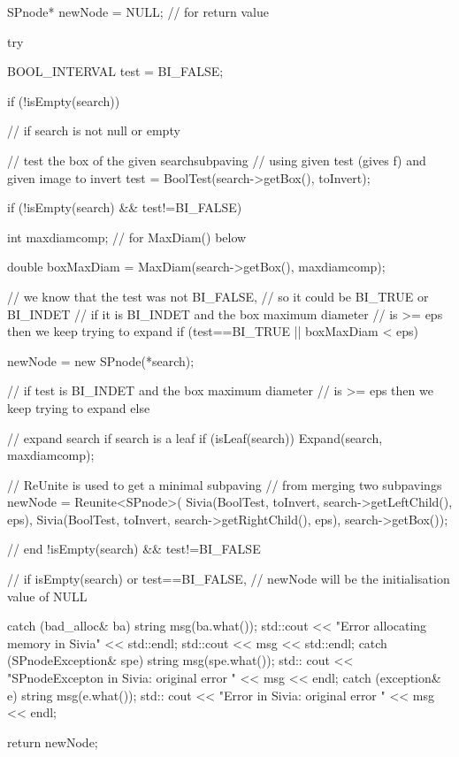 \begin{DoxyCode}
    {
        SPnode* newNode = NULL;  // for return value

        try {
            BOOL_INTERVAL test = BI_FALSE;

            if (!isEmpty(search)) { // if search is not null or empty

                // test the box of the given searchsubpaving
                // using given test (gives f) and given image to invert
                test = BoolTest(search->getBox(), toInvert);
            }

            if (!isEmpty(search) && test!=BI_FALSE) {

                int maxdiamcomp; // for MaxDiam() below

                double boxMaxDiam = MaxDiam(search->getBox(), maxdiamcomp);

                // we know that the test was not BI_FALSE,
                // so it could be BI_TRUE or BI_INDET
                // if it is BI_INDET and the box maximum diameter
                // is >= eps then we keep trying to expand
                if (test==BI_TRUE || boxMaxDiam < eps) {

                    newNode = new SPnode(*search);
                }

                // if test is BI_INDET and the box maximum diameter
                // is >= eps then we keep trying to expand
                else  {

                    // expand search if search is a leaf
                    if (isLeaf(search)) Expand(search,
                                            maxdiamcomp);

                    // ReUnite is used to get a minimal subpaving
                    // from merging two subpavings
                    newNode = Reunite<SPnode>(
                                Sivia(BoolTest, toInvert,
                                search->getLeftChild(), eps),
                            Sivia(BoolTest, toInvert,
                            search->getRightChild(), eps),
                                            search->getBox());
                }


            } // end !isEmpty(search) && test!=BI_FALSE

            // if isEmpty(search) or test==BI_FALSE,
            // newNode will be the initialisation value of NULL
        }
        catch (bad_alloc& ba)
        {
            string msg(ba.what());
            std::cout << "Error allocating memory in Sivia" << std::endl;
            std::cout << msg << std::endl;
        }
        catch (SPnodeException& spe) {
            string msg(spe.what());
            std:: cout << "SPnodeExcepton in Sivia: original error "
                                                << msg << endl;
        }
        catch (exception& e) {
            string msg(e.what());
            std:: cout << "Error in Sivia: original error " << msg << endl;
        }

        return newNode;
    }
\end{DoxyCode}


